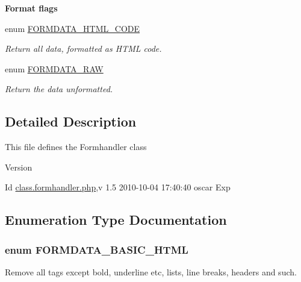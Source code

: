 \begin{Indent}{\bf Format flags}
\begin{DoxyCompactItemize}
enum \hyperlink{class_8formhandler_8php_a73c85f0f80e1060e1adf1efb73639845}{FORMDATA\_\-HTML\_\-CODE} 
\begin{DoxyCompactList}\small\item\em Return all data, formatted as HTML code. \item\end{DoxyCompactList}\item 
enum \hyperlink{class_8formhandler_8php_a982c2cfab5717a3b68087a346cd4addd}{FORMDATA\_\-RAW} 
\begin{DoxyCompactList}\small\item\em Return the data unformatted. \item\end{DoxyCompactList}\end{DoxyCompactItemize}
\end{Indent}


\subsection{Detailed Description}
This file defines the Formhandler class \begin{DoxyVersion}{Version}

\end{DoxyVersion}
\begin{DoxyParagraph}{Id}
\hyperlink{class_8formhandler_8php}{class.formhandler.php},v 1.5 2010-\/10-\/04 17:40:40 oscar Exp 
\end{DoxyParagraph}


\subsection{Enumeration Type Documentation}
\subsubsection[{FORMDATA\_\-BASIC\_\-HTML}]{\setlength{\rightskip}{0pt plus 5cm}enum {\bf FORMDATA\_\-BASIC\_\-HTML}}\label{class_8formhandler_8php_a274bb2c8e23d075b189f143adbb6746e}


Remove all tags except bold, underline etc, lists, line breaks, headers and such. 

